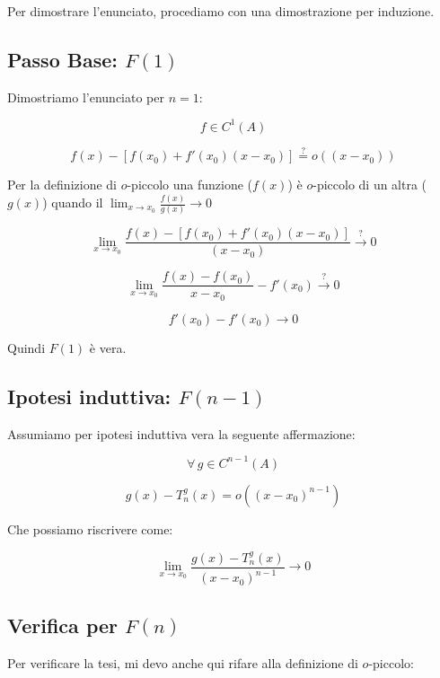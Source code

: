 \documentclass[../../dimostrazioni]{subfiles}
\begin{document}
        Per dimostrare l'enunciato, procediamo con una dimostrazione per induzione.

        \medskip

        \subsection*{Passo Base: \(F(1)\)}

        Dimostriamo l'enunciato per \(n = 1\):
        
        \[  f \in C^1(A)  \]

        \[  f(x) - \left[ f(x_0) + f'(x_0)(x-x_0) \right] \stackrel{?}{=}  o ((x-x_0))  \]

        Per la definizione di \(o\)-piccolo una funzione (\(f(x)\)) è \(o\)-piccolo di un altra (\(g(x)\)) quando il \( \lim_{x \to x_0} \frac{f(x)}{g(x)} \rightarrow 0\) 
        
        \[    \lim_{x \to x_0} \frac{f(x) - \left[ f(x_0) + f'(x_0)(x-x_0) \right]}{(x-x_0)} \stackrel{?}{\rightarrow} 0 \]
            
        \[    \lim_{x \to x_0} \frac{f(x) - f(x_0)}{x - x_0} - f'(x_0) \stackrel{?}{\rightarrow} 0 \]

        \[    f'(x_0) - f'(x_0) \rightarrow 0 \]

        Quindi \(F(1)\) è vera. 

        \subsection*{Ipotesi induttiva: \(F(n-1)\)}

        Assumiamo per ipotesi induttiva vera la seguente affermazione:
        
        \[  \forall \, g \in C^{n-1} (A) \]

        \[  g(x) - T _n ^ g (x) = o ((x-x_0)^{n-1}) \]

        Che possiamo riscrivere come:

        \[  \lim_{x \to x_0} \frac{g(x) - T _n ^ g (x)}{(x-x_0)^{n-1}} \rightarrow 0 \]

        \subsection*{Verifica per \(F(n)\)}

        Per verificare la tesi, mi devo anche qui rifare alla definizione di \(o\)-piccolo:
        
\end{document}
